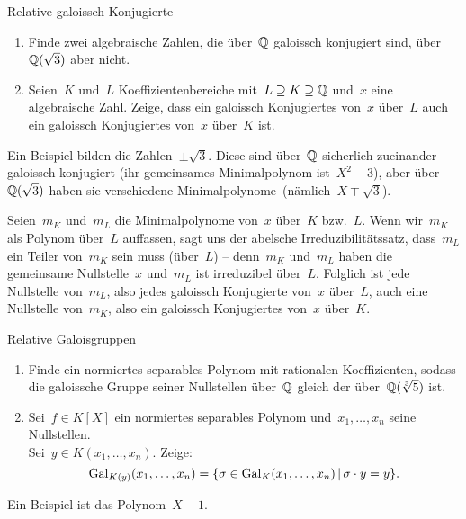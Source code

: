 \documentclass{algblatt}
\begin{document}
\begin{aufgabe}{Relative galoissch Konjugierte}
\begin{enumerate}
\item Finde zwei algebraische Zahlen, die über~$\mathbb{Q}$ galoissch konjugiert sind,
über~$\mathbb{Q}(\sqrt{3})$ aber nicht.
\item Seien~$K$ und~$L$ Koeffizientenbereiche mit~$L \supseteq K \supseteq
\mathbb{Q}$ und~$x$ eine algebraische Zahl. Zeige, dass ein galoissch Konjugiertes
von~$x$ über~$L$ auch ein galoissch Konjugiertes von~$x$ über~$K$ ist.
\end{enumerate}

\begin{loesungE}
\item Ein Beispiel bilden die Zahlen~$\pm\sqrt{3}$. Diese sind über~$\mathbb{Q}$
sicherlich zueinander galoissch konjugiert (ihr gemeinsames Minimalpolynom
ist~$X^2 - 3$), aber über~$\mathbb{Q}(\sqrt{3})$ haben sie verschiedene
Minimalpolynome~(nämlich~$X \mp \sqrt{3}$).

\item Seien~$m_K$ und~$m_L$ die Minimalpolynome von~$x$ über~$K$ bzw.~$L$. Wenn
wir~$m_K$ als Polynom über~$L$ auffassen, sagt uns der abelsche
Irreduzibilitätssatz, dass~$m_L$ ein Teiler von~$m_K$ sein muss (über~$L$) --
denn~$m_K$ und~$m_L$ haben die gemeinsame Nullstelle~$x$ und~$m_L$ ist
irreduzibel über~$L$. Folglich ist jede Nullstelle von~$m_L$, also jedes
galoissch Konjugierte von~$x$ über~$L$, auch eine Nullstelle von~$m_K$, also
ein galoissch Konjugiertes von~$x$ über~$K$.
\end{loesungE}
\end{aufgabe}

\begin{aufgabe}{Relative Galoisgruppen}
\begin{enumerate}
\item Finde ein normiertes separables Polynom mit rationalen Koeffizienten,
sodass die galoissche Gruppe seiner Nullstellen über~$\mathbb{Q}$ gleich der
über~$\mathbb{Q}(\sqrt[3]{5})$ ist.
\item Sei~$f \in K[X]$ ein normiertes separables Polynom und~$x_1,\ldots,x_n$
seine Nullstellen. \\ Sei~$y \in K(x_1,\ldots,x_n)$. Zeige:
\[ \mathrm{Gal}_{K(y)}(x_1,\ldots,x_n) = \{ \sigma \in \mathrm{Gal}_K(x_1,\ldots,x_n) \,|\,
\sigma \cdot y = y \}. \]
\end{enumerate}

\begin{loesungE}
\item Ein Beispiel ist das Polynom~$X - 1$. 
\end{loesungE}
\end{aufgabe}
\end{document}
